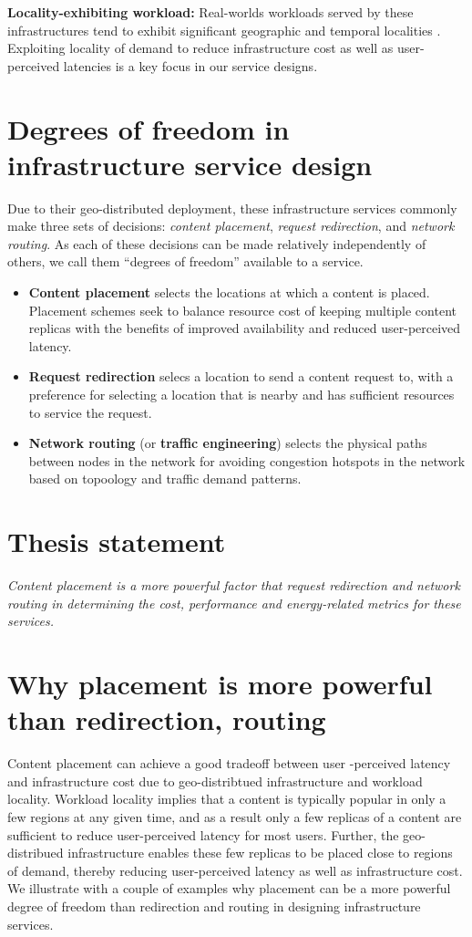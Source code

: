 \textbf{Locality-exhibiting workload:} Real-worlds workloads served by these infrastructures tend to exhibit significant geographic and temporal localities \cite{NCDN, youtubeUGC, vodP2Pbenefit, cellularvideotraffic}. Exploiting locality of demand to reduce infrastructure cost as well as user-perceived latencies is a key focus in our service designs.

\section{Degrees of freedom in infrastructure service design} Due to their geo-distributed deployment, these infrastructure services commonly make three sets of decisions: \emph{content placement}, \emph{request redirection}, and \emph{network routing}. As each of these decisions can be made relatively independently of others, we call them ``degrees of freedom'' available to a service. 
\begin{itemize}
	\item
	\textbf{Content placement} selects the locations at which a content is placed. Placement schemes seek to balance resource cost of keeping multiple content replicas with the benefits of improved availability and reduced user-perceived latency.
	\item
	 \textbf{Request redirection} selecs a location to send a content request to, with a preference for selecting a location that is nearby and has sufficient resources to service the request.
	\item
	 \textbf{Network routing} (or \textbf{traffic engineering}) selects the physical paths between nodes in the network for avoiding congestion hotspots in the network based on topoology and traffic demand patterns.
\end{itemize}


\section{Thesis statement}

\emph{Content placement is a more powerful factor that request redirection and network routing in determining the cost, performance and energy-related metrics for these services.}

\section{Why placement is more powerful than redirection, routing}
Content placement can achieve a good tradeoff between user -perceived latency and infrastructure cost due to geo-distribtued infrastructure and workload locality. Workload locality implies that a content is typically popular in only a few regions at any given time, and as a result only a few replicas of a content are sufficient to reduce user-perceived latency for most users. Further, the geo-distribued infrastructure enables these few replicas to be placed close to regions of demand, thereby reducing user-perceived latency as well as infrastructure cost. We illustrate with a couple of examples why placement can be a more powerful degree of freedom than redirection and routing in designing infrastructure services.


